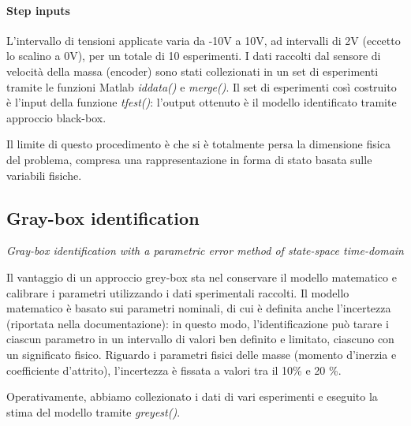 \paragraph{Step inputs}

L'intervallo di tensioni applicate varia da -10V a 10V, ad intervalli di 2V (eccetto lo scalino a 0V), per un totale di 10 esperimenti.
I dati raccolti dal sensore di velocità della massa (encoder) sono stati collezionati in un set di esperimenti tramite le funzioni Matlab \textit{iddata()} e \textit{merge()}. Il set di esperimenti così costruito è l'input della funzione \textit{tfest()}: l'output ottenuto è il modello identificato tramite approccio black-box.

Il limite di questo procedimento è che si è totalmente persa la dimensione fisica del problema, compresa una rappresentazione in forma di stato basata sulle variabili fisiche.

\subsection{Gray-box identification}

\textit{Gray-box identification with a parametric error method of state-space time-domain}
\\ \par Il vantaggio di un approccio grey-box sta nel conservare il modello matematico e calibrare i parametri utilizzando i dati sperimentali raccolti. Il modello matematico è basato sui parametri nominali, di cui è definita anche l'incertezza (riportata nella documentazione): in questo modo, l'identificazione può tarare i ciascun parametro in un intervallo di valori ben definito e limitato, ciascuno con un significato fisico. Riguardo i parametri fisici delle masse (momento d'inerzia e coefficiente d'attrito), l'incertezza è fissata a valori tra il 10\% e 20 \%.

Operativamente, abbiamo collezionato i dati di vari esperimenti e eseguito la stima del modello tramite \textit{greyest()}.




